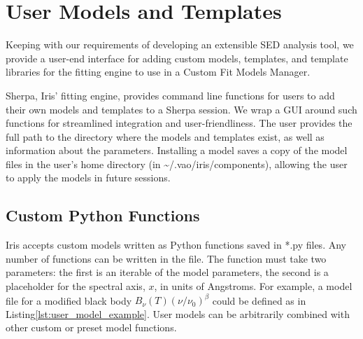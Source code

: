 \documentclass[5p]{elsarticle}
\begin{document}

\section{User Models and Templates}
\label{sec:usermodels}

Keeping with our requirements of developing an extensible SED analysis tool, we provide a user-end interface for adding custom models, templates, and template libraries for the fitting engine to use in a Custom Fit Models Manager.

Sherpa, Iris' fitting engine, provides command line functions for users to add their own models and templates to a Sherpa session. We wrap a GUI around such functions for streamlined integration and user-friendliness.
The user provides the full path to the directory where the models and templates exist, as well as information about the parameters. Installing a model saves a copy of the model files in the user's home directory (in \~{}/.vao/iris/components), allowing the user to apply the models in future sessions.


\subsection{Custom Python Functions}
Iris accepts custom models written as Python functions saved in *.py files. Any number of functions can be written in the file. The function must take two parameters: the first is an iterable of the model parameters, the second is a placeholder for the spectral axis, $x$, in units of Angstroms. For example, a model file for a modified black body
\(B_{\nu}(T) \left(\nu/\nu_{0}\right)^{\beta}\)
could be defined as in Listing\ref{lst:user_model_example}. User models can be arbitrarily combined with other custom or preset model functions.
\end{document}
